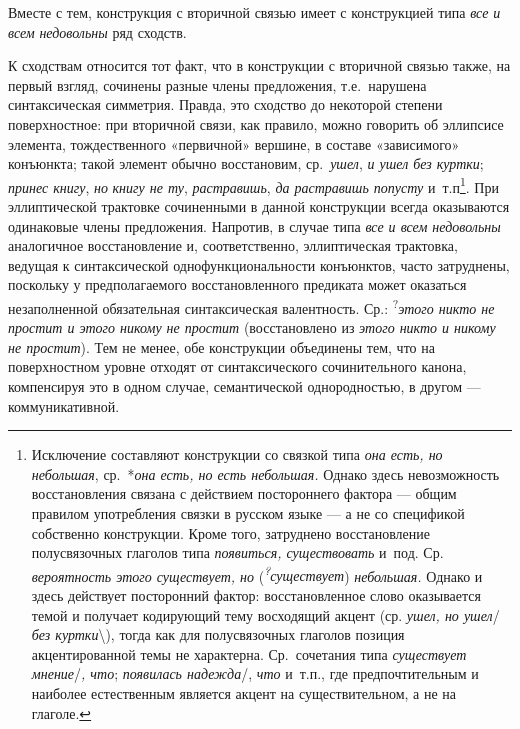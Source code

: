 Вместе с тем, конструкция с вторичной связью имеет с конструкцией типа
\textit{все и всем} \textit{недовольны} ряд сходств.

К сходствам относится тот факт, что в конструкции с вторичной связью
также, на первый взгляд, сочинены разные члены предложения,
т.е.~нарушена синтаксическая симметрия. Правда, это сходство до
некоторой степени поверхностное: при вторичной связи, как правило, можно
говорить об эллипсисе элемента, тождественного «первичной» вершине, в
составе «зависимого» конъюнкта; такой элемент обычно восстановим,
ср.~\textit{ушел}, \textit{и ушел без куртки}; \textit{принес книгу},
\textit{но} \textit{книгу не ту}, \textit{растравишь}, \textit{да растравишь
попусту} и~т.п\footnote{Исключение составляют конструкции со связкой
  типа \textit{она есть, но небольшая}, ср.~*\textit{она есть, но есть
  небольшая.} Однако здесь невозможность восстановления связана с
  действием постороннего фактора --- общим правилом употребления связки в
  русском языке --- а не со спецификой собственно конструкции. Кроме
  того, затруднено восстановление полусвязочных глаголов типа
  \textit{появиться, существовать} и~под. Ср. \textit{вероятность этого
  существует, но} (\textit{\textsuperscript{?}существует})
  \textit{небольшая.} Однако и здесь действует посторонний фактор:
  восстановленное слово оказывается темой и получает кодирующий тему
  восходящий акцент (ср. \textit{ушел, но ушел}/ \textit{без
  куртки}\textbackslash), тогда как для полусвязочных глаголов позиция
  акцентированной темы не характерна. Ср.~сочетания типа
  \textit{существует мнение}/\textit{, что}; \textit{появилась надежда}/,
  \textit{что} и~т.п., где предпочтительным и наиболее естественным
  является акцент на существительном, а не на глаголе.}. При
эллиптической трактовке сочиненными в данной конструкции всегда
оказываются одинаковые члены предложения. Напротив, в случае типа
\textit{все и всем недовольны} аналогичное восстановление и,
соответственно, эллиптическая трактовка, ведущая к синтаксической
однофункциональности конъюнктов, часто затруднены, поскольку у
предполагаемого восстановленного предиката может оказаться незаполненной
обязательная синтаксическая валентность. Ср.:
\textsuperscript{?}\textit{этого никто не простит и этого никому не
простит} (восстановлено из \textit{этого никто и никому не простит}). Тем
не менее, обе конструкции объединены тем, что на поверхностном уровне
отходят от синтаксического сочинительного канона, компенсируя это в
одном случае, семантической однородностью, в другом --- коммуникативной.

